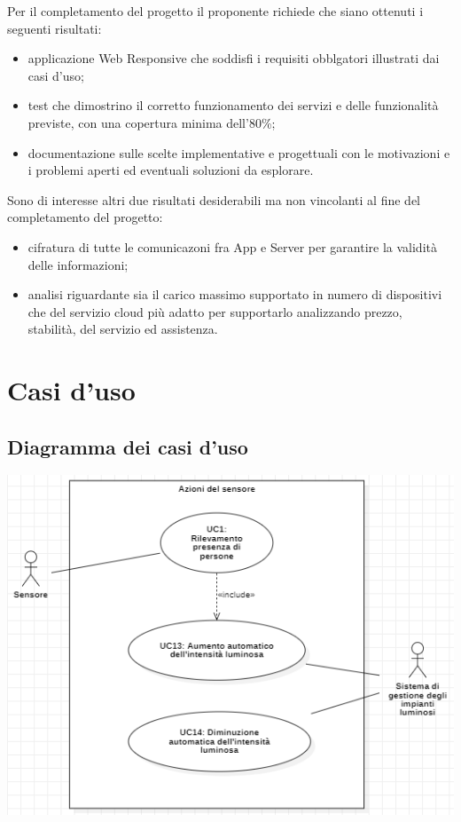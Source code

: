 \documentclass[a4paper, 12pt]{article}
\begin{document}
Per il completamento del progetto il proponente richiede che siano ottenuti i
seguenti risultati:
\begin{itemize}
    \item applicazione Web Responsive che soddisfi i requisiti obblgatori
    illustrati dai casi d'uso;
    \item test che dimostrino il corretto funzionamento dei servizi e delle
    funzionalità previste, con una copertura minima dell'80\%;
    \item documentazione sulle scelte implementative e progettuali con le
    motivazioni e i problemi aperti ed eventuali soluzioni da esplorare.
\end{itemize}
Sono di interesse altri due risultati desiderabili ma non vincolanti al fine del
completamento del progetto:
\begin{itemize}
    \item cifratura di tutte le comunicazoni fra App e Server per garantire la
    validità delle informazioni;
    \item analisi riguardante sia il carico massimo supportato in numero di
    dispositivi che del servizio cloud più adatto per supportarlo
    analizzando prezzo, stabilità, del servizio ed assistenza.
\end{itemize} 
\newpage
\section{Casi d'uso}

\subsection{Diagramma dei casi d'uso}

\includegraphics[scale=0.7]{diagramma_use_case_1.png}
\end{document}
